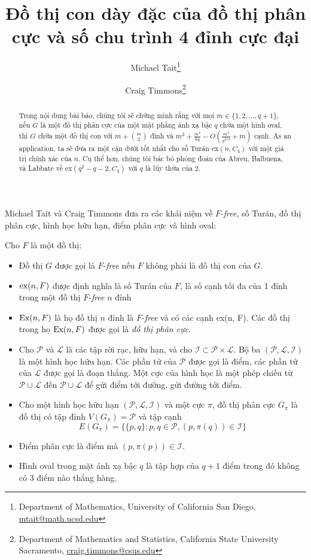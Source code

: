 \documentclass[12pt]{article}
\title{Đồ thị con dày đặc của đồ thị phân cực và số chu trình 4 đỉnh cực đại}
\author{
    Michael Tait\thanks{Department of Mathematics, University of California San Diego, \url{mtait@math.ucsd.edu}}
    \and
    Craig Timmons\thanks{Department of Mathematics and Statistics, California State University Sacramento, \mbox{\url{craig.timmons@csus.edu}}}
}
\date{}
\begin{document}
\maketitle
\vspace{-5mm}

\begin{abstract}
    Trong nội dung bài báo, chúng tôi sẽ chứng minh rằng với mọi \mbox{$m \in \{1,2, \dots , q +1 \}$}, nếu $G$ là một đồ thị phân cực của một mặt phẳng ánh xạ bậc $q$ chứa một hình oval, thì $G$ chứa một đồ thị con với $m + \binom{m}{2}$ đỉnh và $m^2+\frac{m^4}{8q} - O ( \frac{m^4}{q^{3/2} } +m )$ cạnh. As an application, ta sẽ đưa ra một cận dưới tốt nhất cho số Tur\'{a}n  $\mathrm{ex}(n, C_4)$ với một giá trị chính xác của $n$. Cụ thể hơn, chúng tôi bác bỏ phỏng đoán của Abreu, Balbuena, và Labbate về $\mathrm{ex}(q^2-q-2, C_4)$ với $q$ là lũy thừa của $2$.
\end{abstract}


Michael Tait và  Craig Timmons đưa ra các khái niệm về $F$-\emph{free}, số Tur\'{a}n, đồ thị phân cực, hình học hữu hạn, điểm phân cực và hình oval:

Cho $F$ là một đồ thị:
\begin{itemize}
    \item  Đồ thị $G$ được gọi là $F$-\emph{free}  nếu $F$ không phải là đồ thị con của $G$.
    \item $\textup{ex}(n , F)$ được định nghĩa là số Tur\'{a}n của $F$, là số cạnh tối đa của 1 đỉnh trong một đồ thị $F$-\emph{free} $n$ đỉnh
    \item $\textup{Ex}(n  , F)$ là họ đồ thị $n$ đỉnh là $F$-\emph{free} và có các cạnh ex(n, F). Các đồ thị trong họ $\textup{Ex}(n  , F)$ được gọi là \emph{đồ thị phân cực}.
    \item Cho $\mathcal{P}$ và $\mathcal{L}$ là các tập rời rạc, hữu hạn, và cho $\mathcal{I}\subset \mathcal{P}\times \mathcal{L}$. Bộ ba $(\mathcal{P}, \mathcal{L}, \mathcal{I})$ là một hình học hữu hạn. Các phần tử của $\mathcal{P}$ được gọi là điểm, các phần tử của $\mathcal{L}$ được gọi là đoạn thẳng. Một cực của hình học là một phép chiếu từ $\mathcal{P}\cup \mathcal{L}$ đến $\mathcal{P}\cup \mathcal{L}$ để gửi điểm tới đường, gửi đường tới điểm.
    \item Cho một hình học hữu hạn $(\mathcal{P}, \mathcal{L}, \mathcal{I})$ và một cực $\pi$, đồ thị phân cực $G_\pi$ là đồ thị có tập đỉnh $V(G_\pi) = \mathcal{P}$ và tập cạnh
    $$ E(G_\pi) = \{\{p,q\}: p,q\in \mathcal{P}, (p, \pi(q))\in \mathcal{I}\} $$
    \item Điểm phân cực là điểm mà $(p, \pi(p))\in \mathcal{I}$.
    \item Hình oval trong mặt ánh xạ bậc $q$ là tập hợp của $q+1$ điểm trong đó không có 3 điểm nào thẳng hàng.


\end{itemize}
\end{document}
